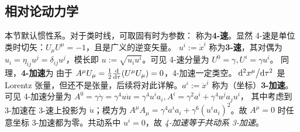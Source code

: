 \subsection{相对论动力学}

本节默认惯性系。对于类时线，可取固有时为参数：
称为\textbf{4-速}。显然 4-速是单位类时切矢：$U_\mu U^\mu=-1$，且是广义的逆变矢量。
$u^i:=\dot{x}^i$ 称为\textbf{3-速}，其对偶为 $u_i=\eta_{ij}u^j=\delta_{ij}u^j$，模长即 $u:=\sqrt{u_i u^i}$。可见 4-速分量为 $U^0=\gamma,U^i=\gamma u^i$。
同理，\textbf{4-加速}为
由于 $A^\mu U_\mu=\frac 12 \dv{\tau}(U^\mu U_\mu)=0$，4-加速一定类空。$\dv*[2]{x^\mu}{\tau}$ 是 Lorentz 张量，但还不是张量，后续将对此详解。$a^i:=\ddot{x}^i$ 称为（坐标）\textbf{3-加速}。
可见 4-加速分量为 $A^0=\gamma \dot{\gamma}=\gamma^4 u\dot{u}=\gamma^4 u^ia_i, A^i=\gamma^2 a^i+\gamma^4 u^ja_j u^i$，
其中考虑到 3-加速在 3-速上投影为 $\dot{u}$；模方为 $A^\mu A_\mu=\gamma^4 a^ia_i+\gamma^6(u^ia_i)^2$。故 $A^\mu=0$ 时任意坐标 3-加速都为零。共动系中 $u^i=0$，故 \textit{4-加速等于共动系 3-加速}。

